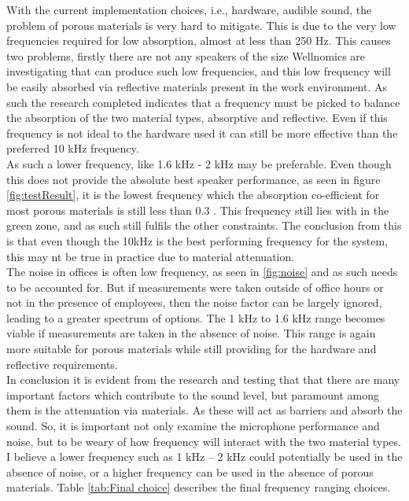With the current implementation choices, i.e., hardware, audible sound, the problem of porous materials is very hard to mitigate. This is due to the very low frequencies required for low absorption, almost at less than 250 Hz. This causes two problems, firstly there are not any speakers of the size Wellnomics are investigating that can produce such low frequencies, and this low frequency will be easily absorbed via reflective materials present in the work environment. As such the research completed indicates that a frequency must be picked to balance the absorption of the two material types, absorptive and reflective. Even if this frequency is not ideal to the hardware used it can still be more effective than the preferred 10 kHz frequency. \\

As such a lower frequency, like 1.6 kHz - 2 kHz may be preferable. Even though this does not provide the absolute best speaker performance, as seen in figure \ref{fig:testResult}, it is the lowest frequency which the absorption co-efficient for most porous materials is still less than 0.3 \cite{jwc}. This frequency still lies with in the green zone, and as such still fulfils the other constraints. The conclusion from this is that even though the 10kHz is the best performing frequency for the system, this may nt be true in practice due to material attenuation. \\

The noise in offices is often low frequency, as seen in \ref{fig:noise} and as such needs to be accounted for. But if measurements were taken outside of office hours or not in the presence of employees, then the noise factor can be largely ignored, leading to a greater spectrum of options. The 1 kHz to 1.6 kHz range becomes viable if measurements are taken in the absence of noise. This range is again more suitable for porous  materials while still providing for the hardware and reflective requirements. \\

In conclusion it is evident from the research and testing that that there are many important factors which contribute to the sound level, but paramount among them is the attenuation via materials. As these will act as barriers and absorb the sound. So, it is important not only examine the microphone performance and noise, but to be weary of how frequency will interact with the two material types. I believe a lower frequency such as 1 kHz – 2 kHz could potentially be used in the absence of noise, or a higher frequency can be used in the absence of porous materials. Table \ref{tab:Final choice} describes the final frequency ranging choices.

